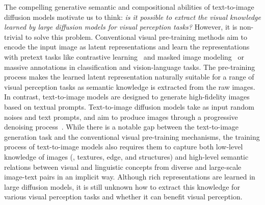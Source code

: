 \documentclass[10pt,twocolumn,letterpaper]{article}
\begin{document}
The compelling generative semantic and compositional abilities of text-to-image diffusion models motivate us to think: \emph{is it possible to extract the visual knowledge learned by large diffusion models for visual perception tasks? } However, it is non-trivial to solve this problem. Conventional visual pre-training methods aim to encode the input image as latent representations  and learn the representations with pretext tasks like contrastive learning~\cite{he2019moco,chen2020simple} and masked image modeling~\cite{bao2021beit,he2022mae} or massive annotations in classification and vision-language tasks. The pre-training process makes the learned latent representation naturally suitable for a range of visual perception tasks as semantic knowledge is extracted from the raw images. In contrast, text-to-image models are designed to generate high-fidelity images based on textual prompts.  Text-to-image diffusion models take as input random noises and text prompts, and aim to produce images through a progressive denoising process~\cite{rombach2022high,ho2020ddpm}.  While there is a notable gap between the text-to-image  generation task and the conventional visual pre-training mechanisms, the training process of text-to-image models also requires them to capture both low-level knowledge of images (\eg, textures, edge, and structures) and high-level semantic relations between visual and linguistic concepts from diverse and large-scale image-text pairs in an implicit way. Although rich representations are learned in large diffusion models, it is still unknown how to extract this knowledge for various visual perception tasks and whether it can benefit visual perception.
\end{document}
